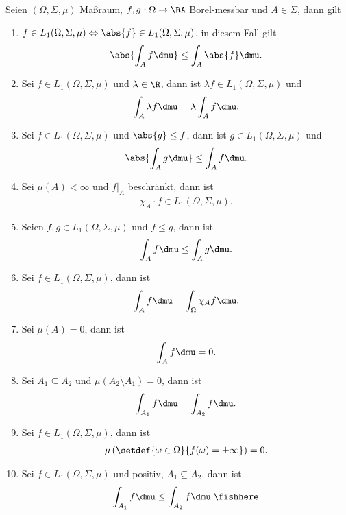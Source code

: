 \newpage
\begin{prop}
\label{prop:3.30}
Seien $(\Omega,\Sigma,\mu)$ Maßraum, $f,g: \Omega\to\RA$ Borel-messbar und
$A\in\Sigma$, dann gilt
\begin{enumerate}[label=(\roman{*})]
  \item\label{prop:3.30:1} $f\in L_1(\Omega,\Sigma,\mu)\Leftrightarrow
  \abs{f}\in L_1(\Omega,\Sigma,\mu)$, in diesem Fall gilt
  \begin{align*}
  \abs{\int_A f\dmu} \le \int_A \abs{f}\dmu.
  \end{align*}
\item\label{prop:3.30:2} Sei $f\in L_1(\Omega,\Sigma,\mu)$ und $\lambda\in\R$,
dann ist $\lambda f\in L_1(\Omega,\Sigma,\mu)$ und 
\begin{align*}
\int_A \lambda f \dmu = \lambda\int_A f\dmu.
\end{align*}
\item\label{prop:3.30:3} Sei $f\in L_1(\Omega,\Sigma,\mu)$ und $\abs{g}\le f$,
dann ist $g\in L_1(\Omega,\Sigma,\mu)$ und
\begin{align*}
  \abs{\int_A g\dmu}\le \int_A f\dmu.
\end{align*}
\item\label{prop:3.30:4} Sei $\mu(A)<\infty$ und $f\big|_A$ beschränkt, dann ist 
\begin{align*}
\chi_A\cdot f\in
L_1(\Omega,\Sigma,\mu).
\end{align*}
\item\label{prop:3.30:5} Seien $f,g\in L_1(\Omega,\Sigma,\mu)$ und $f\le g$,
dann ist
\begin{align*}
\int_A f\dmu \le \int_A g\dmu.
\end{align*}
\item\label{prop:3.30:6} Sei $f\in L_1(\Omega,\Sigma,\mu)$, dann ist
\begin{align*}
\int_A f\dmu = \int_\Omega
\chi_A f \dmu.
\end{align*}
\item\label{prop:3.30:7} Sei $\mu(A) = 0$, dann ist
\begin{align*}
 \int_A f\dmu = 0.      
\end{align*}
\item\label{prop:3.30:8} Sei $A_1\subseteq A_2$ und $\mu(A_2\setminus A_1) =
0$, dann ist
\begin{align*}
\int_{A_1} f\dmu = \int_{A_2} f\dmu.
\end{align*}
\item\label{prop:3.30:9} Sei $f\in L_1(\Omega,\Sigma,\mu)$,
dann ist
\begin{align*}
\mu\left(\setdef{\omega\in\Omega}{f(\omega) = \pm \infty} \right) = 0.
\end{align*}
\item\label{prop:3.30:10} Sei $f\in L_1(\Omega,\Sigma,\mu)$ und positiv,
$A_1\subseteq A_2$, dann ist
\begin{align*}
\int_{A_1} f\dmu \le \int_{A_2} f\dmu.\fishhere
\end{align*}
\end{enumerate}
\end{prop}
